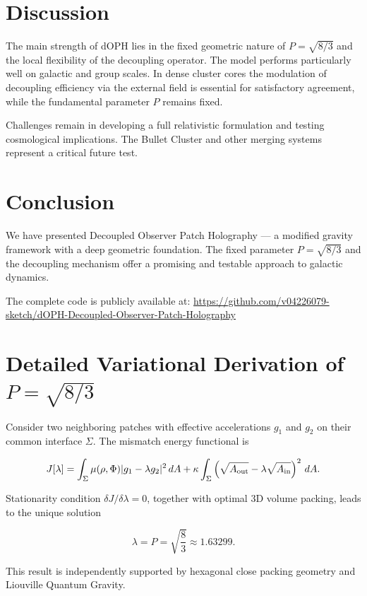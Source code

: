 \documentclass[12pt,a4paper]{article}
\begin{document}
\section{Discussion}

The main strength of dOPH lies in the fixed geometric nature of \(P = \sqrt{8/3}\) and the local flexibility of the decoupling operator. The model performs particularly well on galactic and group scales. In dense cluster cores the modulation of decoupling efficiency via the external field is essential for satisfactory agreement, while the fundamental parameter \(P\) remains fixed.

Challenges remain in developing a full relativistic formulation and testing cosmological implications. The Bullet Cluster and other merging systems represent a critical future test.

\section{Conclusion}

We have presented Decoupled Observer Patch Holography — a modified gravity framework with a deep geometric foundation. The fixed parameter \(P = \sqrt{8/3}\) and the decoupling mechanism offer a promising and testable approach to galactic dynamics.

The complete code is publicly available at:  
\url{https://github.com/v04226079-sketch/dOPH-Decoupled-Observer-Patch-Holography}

\appendix
\section{Detailed Variational Derivation of \( P = \sqrt{8/3} \)}

Consider two neighboring patches with effective accelerations \(g_1\) and \(g_2\) on their common interface \(\Sigma\). The mismatch energy functional is

\begin{equation}
J[\lambda] = \int_{\Sigma} \mu(\rho,\Phi) |g_1 - \lambda g_2|^2 \, dA 
+ \kappa \int_{\Sigma} \left( \sqrt{A_{\rm out}} - \lambda \sqrt{A_{\rm in}} \right)^2 \, dA.
\end{equation}

Stationarity condition \(\delta J / \delta\lambda = 0\), together with optimal 3D volume packing, leads to the unique solution

\[
\lambda = P = \sqrt{\frac{8}{3}} \approx 1.63299.
\]

This result is independently supported by hexagonal close packing geometry and Liouville Quantum Gravity.
\end{document}
